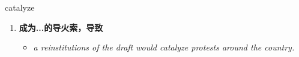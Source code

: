 
\begin{frame}
{\huge catalyze}
\begin{center}
\begin{enumerate}\Large
  \item \textbf{成为...的导火索，导致}
  \begin{itemize}
    \item \em{\Large{a reinstitutions of the draft would catalyze protests around the country.}}
  \end{itemize}
\end{enumerate}
\end{center}
\end{frame}
